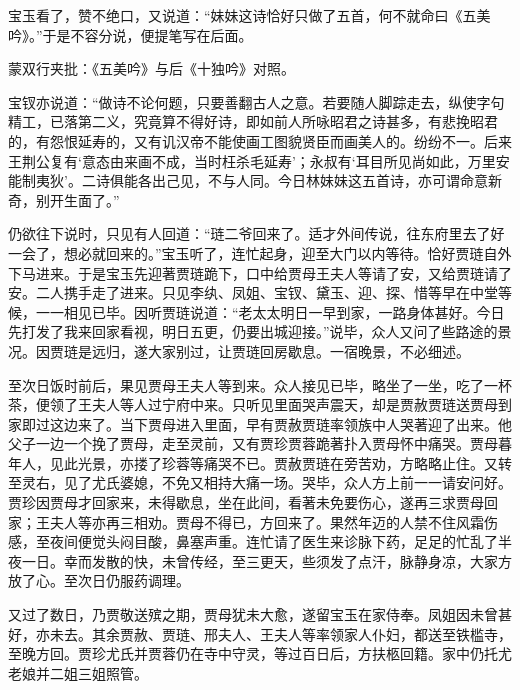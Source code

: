 \begin{parag}
    宝玉看了，赞不绝口，又说道：“妹妹这诗恰好只做了五首，何不就命曰《五美吟》。”于是不容分说，便提笔写在后面。\begin{note}蒙双行夹批：《五美吟》与后《十独吟》对照。\end{note}宝钗亦说道：“做诗不论何题，只要善翻古人之意。若要随人脚踪走去，纵使字句精工，已落第二义，究竟算不得好诗，即如前人所咏昭君之诗甚多，有悲挽昭君的，有怨恨延寿的，又有讥汉帝不能使画工图貌贤臣而画美人的。纷纷不一。后来王荆公复有‘意态由来画不成，当时枉杀毛延寿’；永叔有‘耳目所见尚如此，万里安能制夷狄’。二诗俱能各出己见，不与人同。今日林妹妹这五首诗，亦可谓命意新奇，别开生面了。”
\end{parag}


\begin{parag}
    仍欲往下说时，只见有人回道：“琏二爷回来了。适才外间传说，往东府里去了好一会了，想必就回来的。”宝玉听了，连忙起身，迎至大门以内等待。恰好贾琏自外下马进来。于是宝玉先迎著贾琏跪下，口中给贾母王夫人等请了安，又给贾琏请了安。二人携手走了进来。只见李纨、凤姐、宝钗、黛玉、迎、探、惜等早在中堂等候，一一相见已毕。因听贾琏说道：“老太太明日一早到家，一路身体甚好。今日先打发了我来回家看视，明日五更，仍要出城迎接。”说毕，众人又问了些路途的景况。因贾琏是远归，遂大家别过，让贾琏回房歇息。一宿晚景，不必细述。
\end{parag}


\begin{parag}
    至次日饭时前后，果见贾母王夫人等到来。众人接见已毕，略坐了一坐，吃了一杯茶，便领了王夫人等人过宁府中来。只听见里面哭声震天，却是贾赦贾琏送贾母到家即过这边来了。当下贾母进入里面，早有贾赦贾琏率领族中人哭著迎了出来。他父子一边一个挽了贾母，走至灵前，又有贾珍贾蓉跪著扑入贾母怀中痛哭。贾母暮年人，见此光景，亦搂了珍蓉等痛哭不已。贾赦贾琏在旁苦劝，方略略止住。又转至灵右，见了尤氏婆媳，不免又相持大痛一场。哭毕，众人方上前一一请安问好。贾珍因贾母才回家来，未得歇息，坐在此间，看著未免要伤心，遂再三求贾母回家；王夫人等亦再三相劝。贾母不得已，方回来了。果然年迈的人禁不住风霜伤感，至夜间便觉头闷目酸，鼻塞声重。连忙请了医生来诊脉下药，足足的忙乱了半夜一日。幸而发散的快，未曾传经，至三更天，些须发了点汗，脉静身凉，大家方放了心。至次日仍服药调理。
\end{parag}


\begin{parag}
    又过了数日，乃贾敬送殡之期，贾母犹未大愈，遂留宝玉在家侍奉。凤姐因未曾甚好，亦未去。其余贾赦、贾琏、邢夫人、王夫人等率领家人仆妇，都送至铁槛寺，至晚方回。贾珍尤氏并贾蓉仍在寺中守灵，等过百日后，方扶柩回籍。家中仍托尤老娘并二姐三姐照管。
\end{parag}


